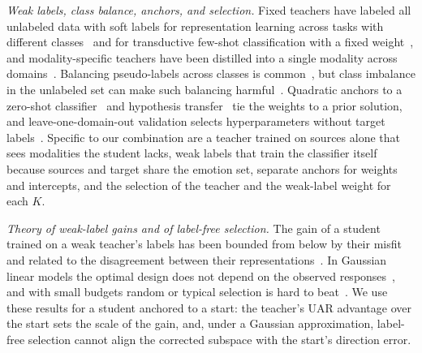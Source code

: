 \emph{Weak labels, class balance, anchors, and selection.}
Fixed teachers have labeled all unlabeled data with soft labels for representation learning across tasks with different classes~\cite{phoo2021selftraining} and for transductive few-shot classification with a fixed weight~\cite{zanella2024boosting}, and modality-specific teachers have been distilled into a single modality across domains~\cite{hatano2024multimodal}.
Balancing pseudo-labels across classes is common~\cite{huang2022unsupervised,xie2020selftraining,hu2021leveraging,berthelot2022adamatch}, but class imbalance in the unlabeled set can make such balancing harmful~\cite{veilleux2021realistic}.
Quadratic anchors to a zero-shot classifier~\cite{silvarodriguez2024closer} and hypothesis transfer~\cite{kuzborskij2017fast,li2018explicit} tie the weights to a prior solution, and leave-one-domain-out validation selects hyperparameters without target labels~\cite{gulrajani2021domainbed}.
Specific to our combination are a teacher trained on sources alone that sees modalities the student lacks, weak labels that train the classifier itself because sources and target share the emotion set, separate anchors for weights and intercepts, and the selection of the teacher and the weak-label weight for each $K$.

\emph{Theory of weak-label gains and of label-free selection.}
The gain of a student trained on a weak teacher's labels has been bounded from below by their misfit~\cite{charikar2024quantifying} and related to the disagreement between their representations~\cite{dong2025discrepancies,xue2025representations}.
In Gaussian linear models the optimal design does not depend on the observed responses~\cite{chaloner1984optimal,chaloner1995bayesian}, and with small budgets random or typical selection is hard to beat~\cite{hacohen2022active}.
We use these results for a student anchored to a start: the teacher's UAR advantage over the start sets the scale of the gain, and, under a Gaussian approximation, label-free selection cannot align the corrected subspace with the start's direction error.
